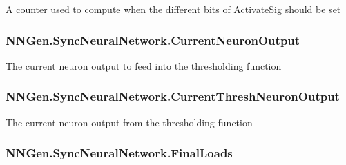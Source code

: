 A counter used to compute when the different bits of Activate\+Sig should be set 

\hypertarget{class_n_n_gen_1_1_sync_neural_network_ac41b8c6d91dd8c38f1bc6800890ed099}{}
\subsubsection[{Current\+Neuron\+Output}]{ N\+N\+Gen.\+Sync\+Neural\+Network.\+Current\+Neuron\+Output\hspace{0.3cm}{\ttfamily [get]}}\label{class_n_n_gen_1_1_sync_neural_network_ac41b8c6d91dd8c38f1bc6800890ed099}


The current neuron output to feed into the thresholding function 

\hypertarget{class_n_n_gen_1_1_sync_neural_network_a79c1844f10a33887abfdae4506524e61}{}
\subsubsection[{Current\+Thresh\+Neuron\+Output}]{ N\+N\+Gen.\+Sync\+Neural\+Network.\+Current\+Thresh\+Neuron\+Output\hspace{0.3cm}{\ttfamily [get]}}\label{class_n_n_gen_1_1_sync_neural_network_a79c1844f10a33887abfdae4506524e61}


The current neuron output from the thresholding function 

\hypertarget{class_n_n_gen_1_1_sync_neural_network_a0da1ffac1794b37b1b27b81fd03253a3}{}
\subsubsection[{Final\+Loads}]{ N\+N\+Gen.\+Sync\+Neural\+Network.\+Final\+Loads\hspace{0.3cm}{\ttfamily [get]}}\label{class_n_n_gen_1_1_sync_neural_network_a0da1ffac1794b37b1b27b81fd03253a3}


